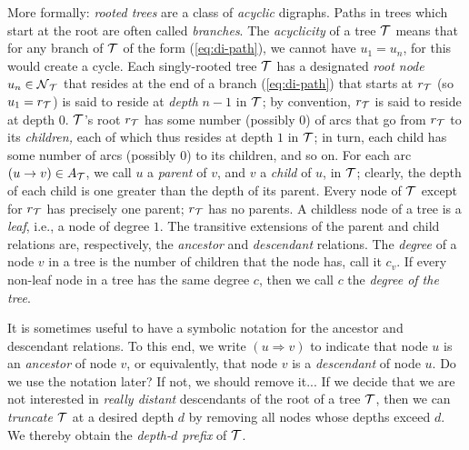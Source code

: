 More formally: {\em rooted trees} are a class of {\em acyclic}
digraphs.  Paths in trees which start at the root are often called
{\em branches}.  The {\em acyclicity} of a tree $\mbox{$\cal T$}$ means that for
any branch of $\mbox{$\cal T$}$ of the form (\ref{eq:di-path}), we cannot have $u_1
= u_n$, for this would create a cycle.  Each singly-rooted tree $\mbox{$\cal T$}$
has a designated {\em root node}  $u_n \in
\mbox{$\cal N$}_{\mbox{{\scriptsize $\cal T$}}}$ that resides at the end of a branch (\ref{eq:di-path}) that
starts at $r_{\mbox{{\scriptsize $\cal T$}}}$ (so $u_1 = r_{\mbox{{\scriptsize $\cal T$}}}$) is said to reside at {\em
  depth} $n-1$ in $\mbox{$\cal T$}$; by convention, $r_{\mbox{{\scriptsize $\cal T$}}}$ is said to reside at
depth $0$.   $\mbox{$\cal T$}$'s
root $r_{\mbox{{\scriptsize $\cal T$}}}$ has some number (possibly $0$) of arcs that go from
$r_{\mbox{{\scriptsize $\cal T$}}}$ to its {\em children,} each of which thus resides at depth
$1$ in $\mbox{$\cal T$}$; in turn, each child has some number of arcs (possibly
$0$) to its children, and so on.  For each arc $(u \rightarrow v) \in
A_{\mbox{{\scriptsize $\cal T$}}}$, we call $u$ a {\it parent}  of $v$,
and $v$ a {\it child}  of $u$, in $\mbox{$\cal T$}$;
clearly, the depth of each child is one greater than the depth of its
parent.  Every node of $\mbox{$\cal T$}$ except for $r_{\mbox{{\scriptsize $\cal T$}}}$ has precisely one
parent; $r_{\mbox{{\scriptsize $\cal T$}}}$ has no parents.  A childless node of a tree is a
{\em leaf},  i.e., a node of degree $1$.  The
transitive extensions of the parent and child relations are,
respectively, the {\em ancestor}  and {\em
  descendant}  relations.  The {\em
  degree}  of a node $v$ in a tree
is the number of children that the node has, call it $c_v$.  If every
non-leaf node in a tree has the same degree $c$, then we call $c$ the
{\em degree of the tree}.  

It is sometimes useful to have a symbolic notation for the ancestor
and descendant relations.  To this end, we write $(u \Rightarrow v)$
 to
indicate that node $u$ is an {\it ancestor} of node $v$, or
equivalently, that node $v$ is a {\it descendant} of node $u$.  
{\Denis Do we use the notation later? If not, we should remove it...}
If we
decide that we are not interested in {\em really distant} descendants
of the root of a tree $\mbox{$\cal T$}$, then we can {\em truncate} 
$\mbox{$\cal T$}$ at a desired depth $d$ by removing all nodes whose depths exceed
$d$.  We thereby obtain the {\em depth-$d$ prefix} of $\mbox{$\cal T$}$.


